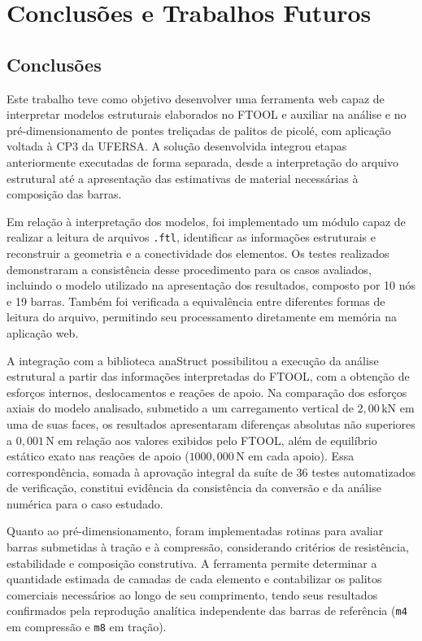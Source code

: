 \chapter{Conclusões e Trabalhos Futuros}
\label{cap:conclusoes-e-trabalhos-futuros}

\section{Conclusões}
\label{sec:conclusoes}

Este trabalho teve como objetivo desenvolver uma ferramenta web capaz de interpretar modelos estruturais elaborados no \acrshort{FTOOL} e auxiliar na análise e no pré-dimensionamento de pontes treliçadas de palitos de picolé, com aplicação voltada à \gls{CP3} da \gls{UFERSA}. A solução desenvolvida integrou etapas anteriormente executadas de forma separada, desde a interpretação do arquivo estrutural até a apresentação das estimativas de material necessárias à composição das barras.

Em relação à interpretação dos modelos, foi implementado um módulo capaz de realizar a leitura de arquivos \texttt{.ftl}, identificar as informações estruturais e reconstruir a geometria e a conectividade dos elementos. Os testes realizados demonstraram a consistência desse procedimento para os casos avaliados, incluindo o modelo utilizado na apresentação dos resultados, composto por 10 nós e 19 barras. Também foi verificada a equivalência entre diferentes formas de leitura do arquivo, permitindo seu processamento diretamente em memória na aplicação web.

A integração com a biblioteca anaStruct possibilitou a execução da análise estrutural a partir das informações interpretadas do \acrshort{FTOOL}, com a obtenção de esforços internos, deslocamentos e reações de apoio. Na comparação dos esforços axiais do modelo analisado, submetido a um carregamento vertical de \(2,00\,\mathrm{kN}\) em uma de suas faces, os resultados apresentaram diferenças absolutas não superiores a \(0,001\,\mathrm{N}\) em relação aos valores exibidos pelo \acrshort{FTOOL}, além de equilíbrio estático exato nas reações de apoio (\(1000,000\,\mathrm{N}\) em cada apoio). Essa correspondência, somada à aprovação integral da suíte de 36 testes automatizados de verificação, constitui evidência da consistência da conversão e da análise numérica para o caso estudado.

Quanto ao pré-dimensionamento, foram implementadas rotinas para avaliar barras submetidas à tração e à compressão, considerando critérios de resistência, estabilidade e composição construtiva. A ferramenta permite determinar a quantidade estimada de camadas de cada elemento e contabilizar os palitos comerciais necessários ao longo de seu comprimento, tendo seus resultados confirmados pela reprodução analítica independente das barras de referência (\texttt{m4} em compressão e \texttt{m8} em tração).

